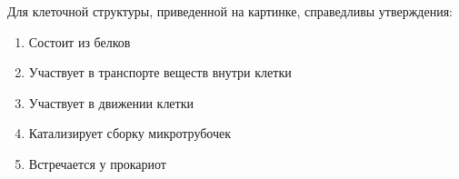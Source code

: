 
Для клеточной структуры,
приведенной на картинке, справедливы утверждения:


\begin{enumerate}
    \item Состоит из белков
    \item Участвует в транспорте веществ внутри клетки
    \item Участвует в движении клетки
    \item Катализирует сборку микротрубочек
    \item Встречается у прокариот
\end{enumerate}

\explanationSection

